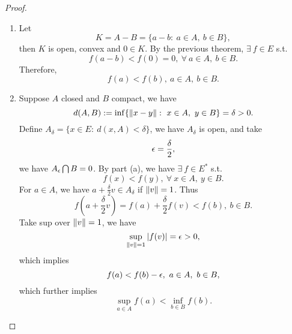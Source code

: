 \begin{proof}\
\begin{enumerate}[label = (\alph*)]
    \item Let 
    \begin{equation*}
        K = A -B = \{a - b:\ a \in A,\ b \in B\},
    \end{equation*}
    then $K$ is open, convex and $0 \in K$. By the previous theorem, $\exists\ f \in E$ s.t.
    \begin{equation*}
        f(a - b) < f(0) = 0,\ \forall\ a \in A,\ b \in B.
    \end{equation*}
    Therefore,
    \begin{equation*}
        f(a) < f(b),\ a \in A,\ b \in B.
    \end{equation*}
    \item Suppose $A$ closed and $B$ compact, we have
    \begin{equation*}
        d(A,B) := \inf\{\norm{x - y}:\ x \in A,\ y \in B\} = \delta > 0.
    \end{equation*}
    Define $A_\delta = \{x \in E:\ d(x,A) < \delta\}$, we have $A_\delta$ is open, and take
    \begin{equation*}
        \epsilon = \frac{\delta}{2},
    \end{equation*}
    we have $A_\epsilon \bigcap B = 0$. By part (a), we have $\exists\ f \in E^*$ s.t.
    \begin{equation*}
        f(x) < f(y),\ \forall\ x \in A,\ y \in B.
    \end{equation*}
    For $a \in A$, we have $a + \frac{\delta}{2} v \in A_\delta$ if $\norm{v} = 1$. Thus
    \begin{equation*}
        f(a + \frac{\delta}{2} v) = f(a) + \frac{\delta}{2} f(v) < f(b),\ b \in B.
    \end{equation*}
    Take sup over $\norm{v} = 1$, we have
    \begin{equation*}
        \sup_{\norm{v} = 1} \abs{f(v)} = \epsilon > 0,
    \end{equation*}
    which implies 
    \begin{equation*}
        f(a) < f(b) - \epsilon,\ a \in A,\ b \in B,
    \end{equation*}
    which further implies
    \begin{equation*}
        \sup_{a \in A} f(a) < \inf_{ b \in B} f(b).
    \end{equation*}
\end{enumerate}
\end{proof}

